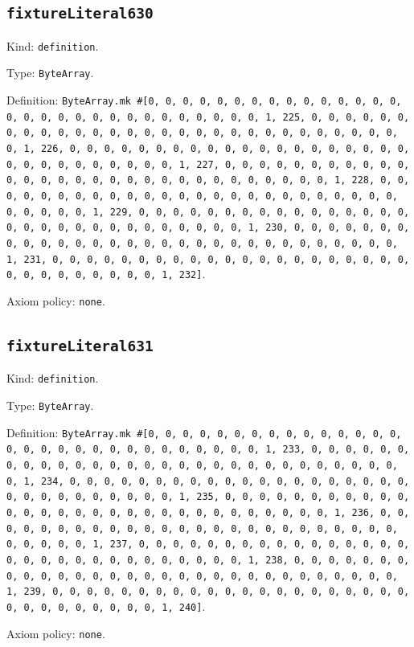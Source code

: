 \documentclass[11pt]{article}
\begin{document}
\subsection*{\texttt{fixtureLiteral630}}
\noindent Kind: \texttt{definition}.\par
\noindent Type: \texttt{ByteArray}.\par
\noindent Definition: \texttt{ByteArray.mk \#[0, 0, 0, 0, 0, 0, 0, 0, 0, 0, 0, 0, 0, 0, 0, 0, 0, 0, 0, 0, 0, 0, 0, 0, 0, 0, 0, 0, 0, 0, 1, 225, 0, 0, 0, 0, 0, 0, 0, 0, 0, 0, 0, 0, 0, 0, 0, 0, 0, 0, 0, 0, 0, 0, 0, 0, 0, 0, 0, 0, 0, 0, 1, 226, 0, 0, 0, 0, 0, 0, 0, 0, 0, 0, 0, 0, 0, 0, 0, 0, 0, 0, 0, 0, 0, 0, 0, 0, 0, 0, 0, 0, 0, 0, 1, 227, 0, 0, 0, 0, 0, 0, 0, 0, 0, 0, 0, 0, 0, 0, 0, 0, 0, 0, 0, 0, 0, 0, 0, 0, 0, 0, 0, 0, 0, 0, 1, 228, 0, 0, 0, 0, 0, 0, 0, 0, 0, 0, 0, 0, 0, 0, 0, 0, 0, 0, 0, 0, 0, 0, 0, 0, 0, 0, 0, 0, 0, 0, 1, 229, 0, 0, 0, 0, 0, 0, 0, 0, 0, 0, 0, 0, 0, 0, 0, 0, 0, 0, 0, 0, 0, 0, 0, 0, 0, 0, 0, 0, 0, 0, 1, 230, 0, 0, 0, 0, 0, 0, 0, 0, 0, 0, 0, 0, 0, 0, 0, 0, 0, 0, 0, 0, 0, 0, 0, 0, 0, 0, 0, 0, 0, 0, 1, 231, 0, 0, 0, 0, 0, 0, 0, 0, 0, 0, 0, 0, 0, 0, 0, 0, 0, 0, 0, 0, 0, 0, 0, 0, 0, 0, 0, 0, 0, 0, 1, 232]}.\par
\noindent Axiom policy: \texttt{none}.\par
\subsection*{\texttt{fixtureLiteral631}}
\noindent Kind: \texttt{definition}.\par
\noindent Type: \texttt{ByteArray}.\par
\noindent Definition: \texttt{ByteArray.mk \#[0, 0, 0, 0, 0, 0, 0, 0, 0, 0, 0, 0, 0, 0, 0, 0, 0, 0, 0, 0, 0, 0, 0, 0, 0, 0, 0, 0, 0, 0, 1, 233, 0, 0, 0, 0, 0, 0, 0, 0, 0, 0, 0, 0, 0, 0, 0, 0, 0, 0, 0, 0, 0, 0, 0, 0, 0, 0, 0, 0, 0, 0, 1, 234, 0, 0, 0, 0, 0, 0, 0, 0, 0, 0, 0, 0, 0, 0, 0, 0, 0, 0, 0, 0, 0, 0, 0, 0, 0, 0, 0, 0, 0, 0, 1, 235, 0, 0, 0, 0, 0, 0, 0, 0, 0, 0, 0, 0, 0, 0, 0, 0, 0, 0, 0, 0, 0, 0, 0, 0, 0, 0, 0, 0, 0, 0, 1, 236, 0, 0, 0, 0, 0, 0, 0, 0, 0, 0, 0, 0, 0, 0, 0, 0, 0, 0, 0, 0, 0, 0, 0, 0, 0, 0, 0, 0, 0, 0, 1, 237, 0, 0, 0, 0, 0, 0, 0, 0, 0, 0, 0, 0, 0, 0, 0, 0, 0, 0, 0, 0, 0, 0, 0, 0, 0, 0, 0, 0, 0, 0, 1, 238, 0, 0, 0, 0, 0, 0, 0, 0, 0, 0, 0, 0, 0, 0, 0, 0, 0, 0, 0, 0, 0, 0, 0, 0, 0, 0, 0, 0, 0, 0, 1, 239, 0, 0, 0, 0, 0, 0, 0, 0, 0, 0, 0, 0, 0, 0, 0, 0, 0, 0, 0, 0, 0, 0, 0, 0, 0, 0, 0, 0, 0, 0, 1, 240]}.\par
\noindent Axiom policy: \texttt{none}.\par
\end{document}
